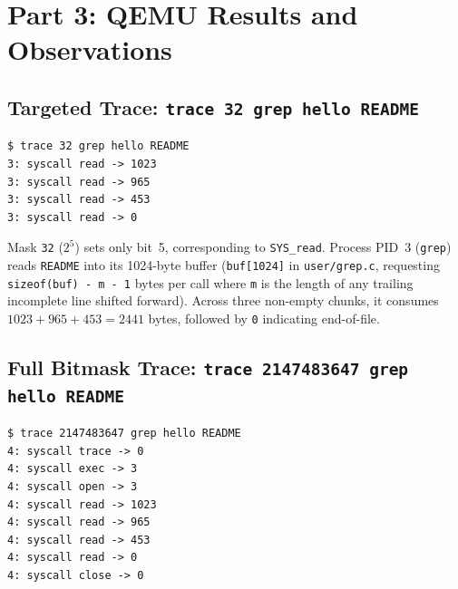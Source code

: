 \documentclass[12pt,a4paper]{article}
\begin{document}
\section{Part 3: QEMU Results and Observations}

\subsection{Targeted Trace: \texttt{trace 32 grep hello README}}
\begin{lstlisting}[style=consolestyle]
$ trace 32 grep hello README
3: syscall read -> 1023
3: syscall read -> 965
3: syscall read -> 453
3: syscall read -> 0
\end{lstlisting}

Mask \texttt{32} ($2^5$) sets only bit~5, corresponding to \texttt{SYS\_read}. Process PID~3 (\texttt{grep}) reads \texttt{README} into its 1024-byte buffer (\texttt{buf[1024]} in \texttt{user/grep.c}, requesting \texttt{sizeof(buf) - m - 1} bytes per call where \texttt{m} is the length of any trailing incomplete line shifted forward). Across three non-empty chunks, it consumes $1023 + 965 + 453 = 2441$ bytes, followed by \texttt{0} indicating end-of-file.

\subsection{Full Bitmask Trace: \texttt{trace 2147483647 grep hello README}}
\begin{lstlisting}[style=consolestyle]
$ trace 2147483647 grep hello README
4: syscall trace -> 0
4: syscall exec -> 3
4: syscall open -> 3
4: syscall read -> 1023
4: syscall read -> 965
4: syscall read -> 453
4: syscall read -> 0
4: syscall close -> 0
\end{lstlisting}
\end{document}
